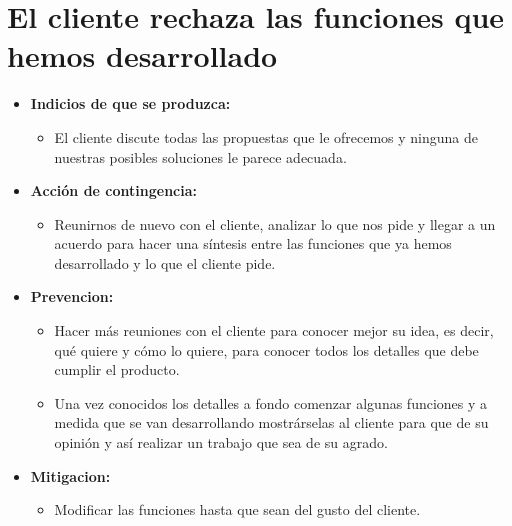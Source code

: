 \documentclass[spanish,a4paper,11pt, twoside]{report}	%
\begin{document}
	\section{El cliente rechaza las funciones que hemos desarrollado}
		\begin{itemize}
			\item \textbf {Indicios de que se produzca: }
				\begin{itemize}
				  \item El cliente discute todas las
						propuestas que le ofrecemos y ninguna de nuestras posibles soluciones le parece
						adecuada.
				\end{itemize}
			\item \textbf {Acción de contingencia: }
				\begin{itemize}
				  \item Reunirnos de nuevo con el cliente,
						analizar lo que nos pide y llegar a un acuerdo para hacer una síntesis entre las
						funciones que ya hemos desarrollado y lo que el cliente pide.
				\end{itemize}
			\item \textbf {Prevencion: }
				\begin{itemize}
				  \item Hacer más reuniones con el cliente para conocer
						mejor su idea, es decir, qué quiere y cómo lo quiere, para conocer todos los
						detalles que debe cumplir el producto. 
				  \item Una vez conocidos los detalles a fondo
						comenzar algunas funciones y a medida que se van desarrollando mostrárselas al
						cliente para que de su opinión y así realizar un trabajo que sea de su agrado.
				\end{itemize}
			\item \textbf {Mitigacion: }
				\begin{itemize}
			  			\item Modificar las funciones hasta que sean del gusto del
							cliente.
				\end{itemize}
		\end{itemize}
	
\end{document}
